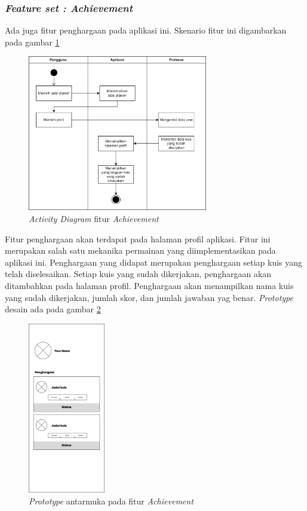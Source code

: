 \subsubsection{\textit{Feature set : Achievement}}

Ada juga fitur penghargaan pada aplikasi ini. Skenario fitur ini digambarkan pada gambar \ref*{Fig:ActivityProfiil}
\begin{figure}[H]
	\centering
	\includegraphics[width=0.7\textwidth]{contents/chapter-3/images/AD-profil.png}
	\caption{\textit{Activity Diagram} fitur \textit{Achievement}}
	\label{Fig:ActivityProfiil}
\end{figure}
Fitur penghargaan akan terdapat pada halaman profil aplikasi.
Fitur ini merupakan salah satu mekanika permainan yang diimplementasikan pada aplikasi ini.
Penghargaan yang didapat merupakan penghargaan setiap kuis yang telah diselesaikan.
Setiap kuis yang sudah dikerjakan, penghargaan akan ditambahkan pada halaman profil.
Penghargaan akan menampilkan nama kuis yang sudah dikerjakan, jumlah skor, dan jumlah jawaban yag benar.
\textit{Prototype} desain ada pada gambar \ref*{Fig:ActivityProfil2}
\begin{figure}[H]
	\centering
	\includegraphics[width=0.3\textwidth]{contents/chapter-3/images/MF-Profil.png}
	\caption{\textit{Prototype} antarmuka pada fitur \textit{Achievement}}
	\label{Fig:ActivityProfil2}
\end{figure}
